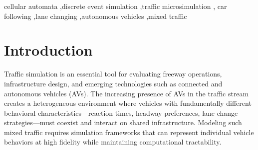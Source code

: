 \documentclass[review,authoryear]{elsarticle}
\begin{document}
\begin{frontmatter}
\begin{abstract}
We derive closed-form expressions linking the resource protocol parameters to macroscopic traffic quantities---capacity, critical density, and backward wave speed---and extend the analysis to mixed AV/HDV traffic. Computational experiments on a four-lane freeway demonstrate that the framework reproduces smooth fundamental diagrams consistent with theory, captures transient congestion dynamics during lane-closure incidents, and models mixed autonomous and human-driven vehicle populations. In experiments with 20 independent replications, increasing AV penetration from 0\% to 70\% yields a 48\% throughput improvement (from $4{,}494 \pm 14$ to $6{,}664 \pm 48$\,veh/h, 95\% CI) and an 89\% delay reduction (from $254 \pm 7$ to $28 \pm 1$\,s), driven by the reduced headway parameter in the resource protocol and the elimination of discretionary lane-change friction under centralized AV control. A lane-drop bottleneck experiment reveals that the throughput benefit of AV penetration plateaus near 50\% ($\approx$1{,}773\,veh/h), with the 50\% and 70\% AV scenarios producing statistically indistinguishable throughput.
\end{abstract}

\begin{keyword}
cellular automata \sep discrete event simulation \sep traffic microsimulation \sep
car following \sep lane changing \sep autonomous vehicles \sep mixed traffic
\end{keyword}

\end{frontmatter}

\section{Introduction}
\label{sec:introduction}

Traffic simulation is an essential tool for evaluating freeway operations, infrastructure design, and emerging technologies such as connected and autonomous vehicles (AVs). The increasing presence of AVs in the traffic stream creates a heterogeneous environment where vehicles with fundamentally different behavioral characteristics---reaction times, headway preferences, lane-change strategies---must coexist and interact on shared infrastructure. Modeling such mixed traffic requires simulation frameworks that can represent individual vehicle behaviors at high fidelity while maintaining computational tractability.
\end{document}
